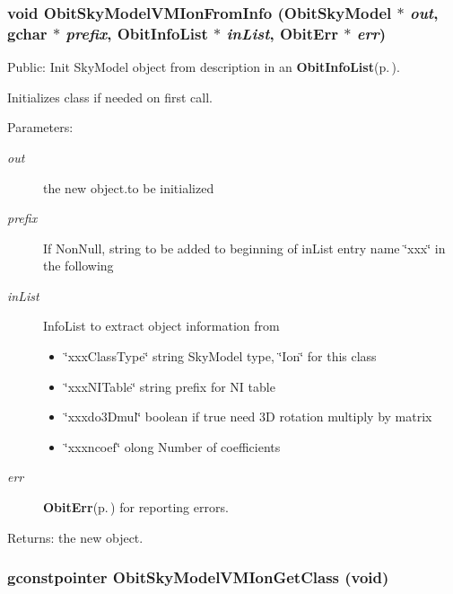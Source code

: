 \subsubsection{\setlength{\rightskip}{0pt plus 5cm}void Obit\-Sky\-Model\-VMIon\-From\-Info ({\bf Obit\-Sky\-Model} $\ast$ {\em out}, gchar $\ast$ {\em prefix}, {\bf Obit\-Info\-List} $\ast$ {\em in\-List}, {\bf Obit\-Err} $\ast$ {\em err})}\label{ObitSkyModelVMIon_8c_a8}


Public: Init Sky\-Model object from description in an {\bf Obit\-Info\-List}{\rm (p.\,\pageref{structObitInfoList})}. 

Initializes class if needed on first call. \begin{Desc}
\item[Parameters:]
\begin{description}
\item[{\em out}]the new object.to be initialized \item[{\em prefix}]If Non\-Null, string to be added to beginning of in\-List entry name \char`\"{}xxx\char`\"{} in the following \item[{\em in\-List}]Info\-List to extract object information from \begin{itemize}
\item \char`\"{}xxx\-Class\-Type\char`\"{} string Sky\-Model type, \char`\"{}Ion\char`\"{} for this class \item \char`\"{}xxx\-NITable\char`\"{} string prefix for NI table \item \char`\"{}xxxdo3Dmul\char`\"{} boolean if true need 3D rotation multiply by matrix \item \char`\"{}xxxncoef\char`\"{} olong Number of coefficients \end{itemize}
\item[{\em err}]{\bf Obit\-Err}{\rm (p.\,\pageref{structObitErr})} for reporting errors. \end{description}
\end{Desc}
\begin{Desc}
\item[Returns:]the new object. \end{Desc}
\subsubsection{\setlength{\rightskip}{0pt plus 5cm}gconstpointer Obit\-Sky\-Model\-VMIon\-Get\-Class (void)}\label{ObitSkyModelVMIon_8c_a9}


